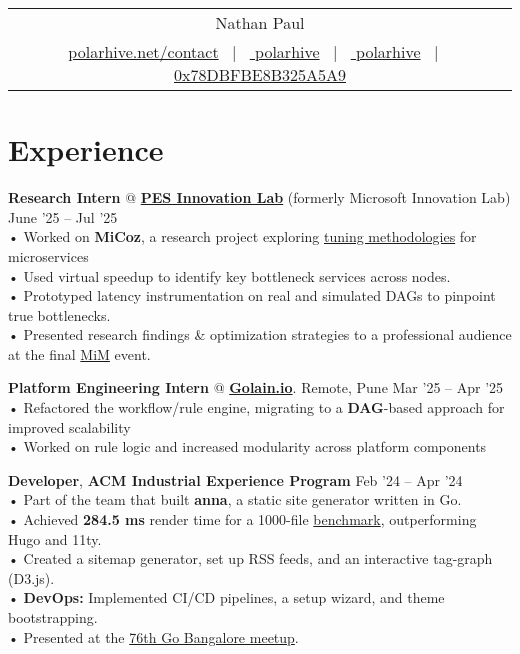 \documentclass[a4,12pt]{article}
\begin{document}
\begin{tabularx}{\linewidth}{@{}C@{}}
\Huge{Nathan Paul} \\[10pt]
\href{https://polarhive.net}{ polarhive.net/contact} \ $|$ \
\href{https://github.com/polarhive}{ polarhive} \ $|$ \
\href{https://linkedin.com/in/polarhive}{ polarhive} \ $|$ \
\href{https://polarhive.net/email}{ 0x78DBFBE8B325A5A9}
\end{tabularx}

\section{Experience}

\textbf{Research Intern} @ \textbf{\href{https://theinnovationlab.in/projects?project=MiCoz}{PES Innovation Lab}} (formerly Microsoft Innovation Lab) \hfill June '25 – Jul '25 \\
• Worked on \textbf{MiCoz}, a research project exploring \href{https://dl.acm.org/doi/10.1145/2815400.2815409}{tuning methodologies} for microservices\\
• Used virtual speedup to identify key bottleneck services across nodes. \\
• Prototyped latency instrumentation on real and simulated DAGs to pinpoint true bottlenecks. \\
• Presented research findings \& optimization strategies to a professional audience at the final \href{https://www.linkedin.com/posts/polarhive_research-internship-theinnovationlab-activity-7366541471715368961-em_T}{MiM} event.

\textbf{Platform Engineering Intern} @ \textbf{\href{https://golain.io}{Golain.io}}. Remote, Pune \hfill Mar '25 – Apr '25 \\
• Refactored the workflow/rule engine, migrating to a \textbf{DAG}-based approach for improved scalability \\
• Worked on rule logic and increased modularity across platform components

\textbf{Developer}, \textbf{ACM Industrial Experience Program} \hfill Feb '24 – Apr '24 \\
• Part of the team that built \textbf{anna}, a static site generator written in Go. \\
• Achieved \textbf{284.5 ms} render time for a 1000-file \href{https://github.com/anna-ssg/anna/actions}{benchmark}, outperforming Hugo and 11ty. \\
• Created a sitemap generator, set up RSS feeds, and an interactive tag-graph (D3.js). \\
• \textbf{DevOps:} Implemented CI/CD pipelines, a setup wizard, and theme bootstrapping. \\
• Presented at the \href{https://www.meetup.com/golang-bangalore/events/301697429/}{76th Go Bangalore meetup}.
\end{document}
